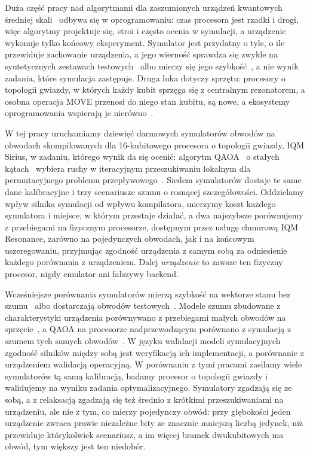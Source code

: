 \documentclass{scspaperproc}
\begin{document}
Duża część pracy nad algorytmami dla zaszumionych urządzeń kwantowych średniej skali~\cite{preskill2018} odbywa się w oprogramowaniu: czas procesora jest rzadki
i drogi, więc algorytmy projektuje się, stroi i często ocenia w symulacji,
a urządzenie wykonuje tylko końcowy eksperyment. Symulator jest przydatny
o tyle, o ile przewiduje zachowanie urządzenia, a jego wierność sprawdza się
zwykle na syntetycznych zestawach testowych~\cite{li2023qasmbench} albo mierzy
się jego szybkość~\cite{jamadagni2024bench}, a nie wynik zadania, które
symulacja zastępuje. Druga luka dotyczy sprzętu: procesory o topologii
gwiazdy, w których każdy kubit sprzęga się z centralnym rezonatorem, a osobna
operacja MOVE przenosi do niego stan kubitu, są nowe, a ekosystemy
oprogramowania wspierają je nierówno~\cite{gnatowski2026routing}.

W tej pracy uruchamiamy dziewięć darmowych symulatorów obwodów na obwodach
skompilowanych dla 16-kubitowego procesora o topologii gwiazdy, IQM Sirius,
w zadaniu, którego wynik da się ocenić: algorytm QAOA~\cite{farhi2014qaoa}
o stałych kątach~\cite{wurtz2021fixed} wybiera ruchy w iteracyjnym
przeszukiwaniu lokalnym dla permutacyjnego problemu
przepływowego~\cite{anon2026a,anon2026b,anon2026c}. Siedem symulatorów dostaje
te same dane kalibracyjne i trzy scenariusze szumu o rosnącej szczegółowości.
Oddzielamy wpływ silnika symulacji od wpływu kompilatora, mierzymy koszt
każdego symulatora i miejsce, w którym przestaje działać, a dwa najszybsze
porównujemy z przebiegami na fizycznym procesorze, dostępnym przez usługę
chmurową IQM Resonance, zarówno na pojedynczych obwodach, jak i na końcowym
uszeregowaniu, przyjmując zgodność urządzenia z samym sobą za odniesienie
każdego porównania z urządzeniem. Dalej \emph{urządzenie} to zawsze ten
fizyczny procesor, nigdy emulator ani fałszywy backend.

Wcześniejsze porównania symulatorów mierzą szybkość na wektorze stanu bez
szumu~\cite{jamadagni2024bench} albo dostarczają obwodów
testowych~\cite{li2023qasmbench}. Modele szumu zbudowane z charakterystyki
urządzenia porównywano z przebiegami małych obwodów na
sprzęcie~\cite{georgopoulos2021noise,dahlhauser2021noisy}, a QAOA na procesorze
nadprzewodzącym porównano z symulacją z szumem tych samych
obwodów~\cite{harrigan2021qaoa}. W języku walidacji modeli
symulacyjnych~\cite{sargent2013vv} zgodność silników między sobą jest
weryfikacją ich implementacji, a porównanie z urządzeniem walidacją
operacyjną. W porównaniu z tymi pracami zasilamy wiele symulatorów tą samą
kalibracją, badamy procesor o topologii gwiazdy i walidujemy na wyniku zadania
optymalizacyjnego. Symulatory zgadzają się ze sobą, a z relaksacją zgadzają się
też średnio z krótkimi przeszukiwaniami na urządzeniu, ale nie z tym, co mierzy
pojedynczy obwód: przy głębokości jeden urządzenie zwraca prawie niezależne
bity ze znacznie mniejszą liczbą jedynek, niż przewiduje którykolwiek
scenariusz, a im więcej bramek dwukubitowych ma obwód, tym większy jest ten
niedobór.
\end{document}
